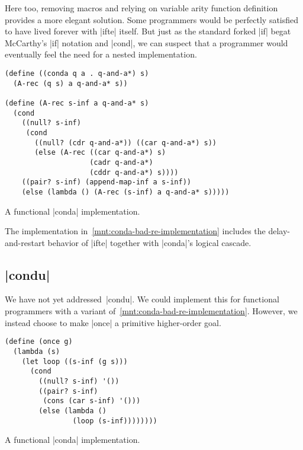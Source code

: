 \documentclass[sigplan,screen,draft,anonymous,review,natbib=false]{acmart}
\begin{document}
Here too, removing macros and relying on variable arity function
definition provides a more elegant solution. Some programmers would be
perfectly satisfied to have lived forever with \rackinline|ifte|
itself. But just as the standard forked \rackinline|if| begat
McCarthy's \rackinline|if| notation and \rackinline|cond|, we can
suspect that a programmer would eventually feel the need for a nested
implementation.

\begin{listing}
  \begin{verbatim}
(define ((conda q a . q-and-a*) s)
  (A-rec (q s) a q-and-a* s))

(define (A-rec s-inf a q-and-a* s)
  (cond
    ((null? s-inf)
     (cond
       ((null? (cdr q-and-a*)) ((car q-and-a*) s))
       (else (A-rec ((car q-and-a*) s)
                    (cadr q-and-a*)
                    (cddr q-and-a*) s))))
    ((pair? s-inf) (append-map-inf a s-inf))
    (else (lambda () (A-rec (s-inf) a q-and-a* s)))))
  \end{verbatim}
  \caption{A functional \rackinline|conda| implementation.}
  \label{mnt:conda-bad-re-implementation}
\end{listing}

The implementation in~\cref{mnt:conda-bad-re-implementation} includes
the delay-and-restart behavior of \rackinline|ifte| together with
\rackinline|conda|'s logical cascade.

\subsection{\rackinline|condu|}

We have not yet addressed~\rackinline|condu|. We could implement this
for functional programmers with a variant
of~\cref{mnt:conda-bad-re-implementation}. However, we instead choose
to make \rackinline|once| a primitive higher-order goal.

\begin{listing}
  \begin{verbatim}
(define (once g)
  (lambda (s)
    (let loop ((s-inf (g s)))
      (cond
        ((null? s-inf) '())
        ((pair? s-inf)
         (cons (car s-inf) '()))
        (else (lambda ()
                (loop (s-inf))))))))
  \end{verbatim}
  \caption{A functional \rackinline|conda| implementation.}
  \label{mnt:conda-bad-re-implementation}
\end{listing}
\end{document}
